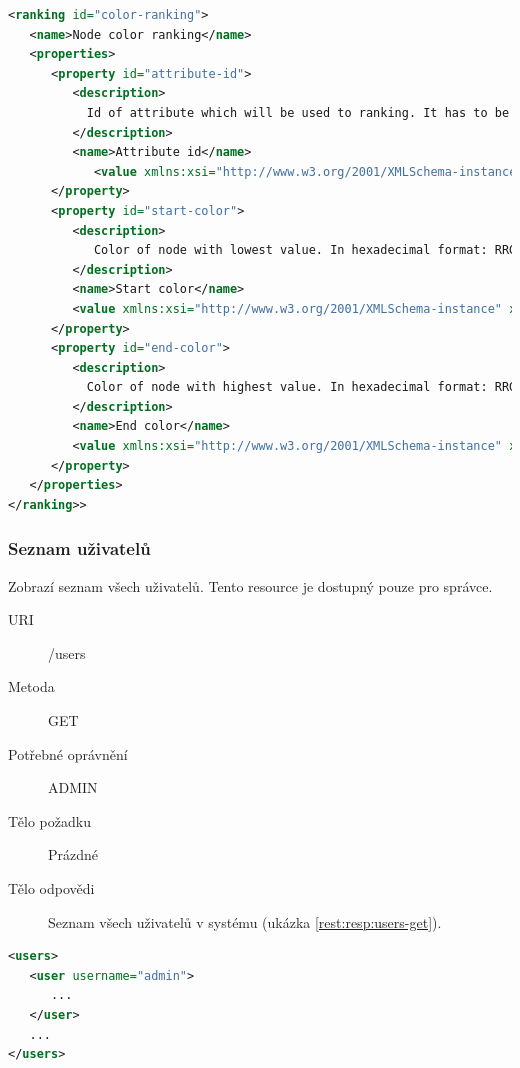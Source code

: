\documentclass[thesis=M,czech]{FITthesis}[2014/05/6]
\begin{document}
\begin{lstlisting}[caption=Tělo odpovědi zdroje /rankings/\{ranking\_id\} (GET), label=rest:resp:ranking, language=xml]
<ranking id="color-ranking">
   <name>Node color ranking</name>
   <properties>
      <property id="attribute-id">
         <description>
           Id of attribute which will be used to ranking. It has to be one of already calculated node attributes (see GEXF format)
         </description>
         <name>Attribute id</name>
            <value xmlns:xsi="http://www.w3.org/2001/XMLSchema-instance" xmlns:xs="http://www.w3.org/2001/XMLSchema" xsi:type="xs:string">degree</value>
      </property>
      <property id="start-color">
         <description>
            Color of node with lowest value. In hexadecimal format: RRGGBB, e.g. FEF0D9
         </description>
         <name>Start color</name>
         <value xmlns:xsi="http://www.w3.org/2001/XMLSchema-instance" xmlns:xs="http://www.w3.org/2001/XMLSchema" xsi:type="xs:string">FEF0D9</value>
      </property>
      <property id="end-color">
         <description>
           Color of node with highest value. In hexadecimal format: RRGGBB, e.g. B30000
         </description>
         <name>End color</name>
         <value xmlns:xsi="http://www.w3.org/2001/XMLSchema-instance" xmlns:xs="http://www.w3.org/2001/XMLSchema" xsi:type="xs:string">B30000</value>
      </property>
   </properties>
</ranking>>
\end{lstlisting}  

\subsubsection{Seznam uživatelů}
Zobrazí seznam všech uživatelů. Tento resource je dostupný pouze pro správce.
\begin{description}
  \item[URI] /users
  \item[Metoda] GET
  \item[Potřebné oprávnění] ADMIN
  \item[Tělo požadku] Prázdné
  \item[Tělo odpovědi] Seznam všech uživatelů v systému (ukázka \ref{rest:resp:users-get}).
\end{description}

\begin{lstlisting}[caption=Tělo odpovědi zdroje /users (GET), label=rest:resp:users-get, language=xml]
<users>
   <user username="admin">
      ...
   </user>
   ...
</users>
\end{lstlisting}  
\end{document}
